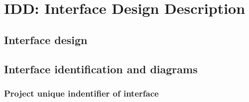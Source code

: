 \section{IDD: Interface Design Description}

\subsection{Interface design}

\subsection{Interface identification and diagrams}

\subsubsection{{Project unique indentifier of interface}}
